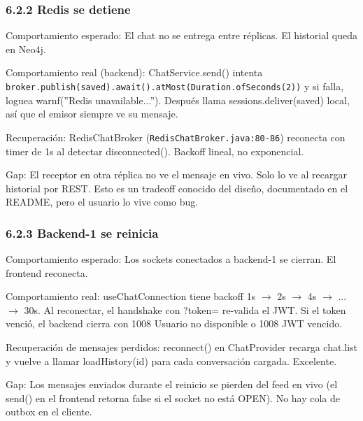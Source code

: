\documentclass[10pt,a4paper]{article}
\newcommand{\code}[1]{\nolinkurl{#1}}
\begin{document}
\subsubsection{6.2.2 Redis se detiene}
Comportamiento esperado: El chat no se entrega entre réplicas. El historial queda en Neo4j.\par\vspace{0.4em}
Comportamiento real (backend): ChatService.send() intenta \code{broker.publish(saved).await().atMost(Duration.ofSeconds(2))} y si falla, loguea warnf(''Redis unavailable...''). Después llama sessions.deliver(saved) local, así que el emisor siempre ve su mensaje.\par\vspace{0.4em}
Recuperación: RedisChatBroker (\code{RedisChatBroker.java:80-86}) reconecta con timer de 1s al detectar disconnected(). Backoff lineal, no exponencial.\par\vspace{0.4em}
Gap: El receptor en otra réplica no ve el mensaje en vivo. Solo lo ve al recargar historial por REST. Esto es un tradeoff conocido del diseño, documentado en el README, pero el usuario lo vive como bug.\par\vspace{0.4em}
\subsubsection{6.2.3 Backend-1 se reinicia}
Comportamiento esperado: Los sockets conectados a backend-1 se cierran. El frontend reconecta.\par\vspace{0.4em}
Comportamiento real: useChatConnection tiene backoff 1s $\rightarrow$ 2s $\rightarrow$ 4s $\rightarrow$ ... $\rightarrow$ 30s. Al reconectar, el handshake con ?token= re-valida el JWT. Si el token venció, el backend cierra con 1008 Usuario no disponible o 1008 JWT vencido.\par\vspace{0.4em}
Recuperación de mensajes perdidos: reconnect() en ChatProvider recarga chat.list y vuelve a llamar loadHistory(id) para cada conversación cargada. Excelente.\par\vspace{0.4em}
Gap: Los mensajes enviados durante el reinicio se pierden del feed en vivo (el send() en el frontend retorna false si el socket no está OPEN). No hay cola de outbox en el cliente.\par\vspace{0.4em}
\end{document}
